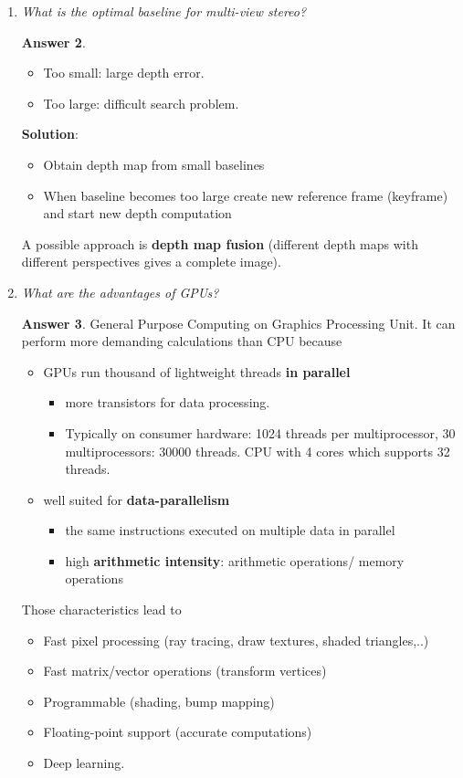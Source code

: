 \documentclass[a4paper,12 pt]{article}
\theoremstyle{definition}
\theoremstyle{remark}
\theoremstyle{definition}
\theoremstyle{definition}
\theoremstyle{definition}
\theoremstyle{definition}
\theoremstyle{remark}
\theoremstyle{remark}
\theoremstyle{definition}
\theoremstyle{definition}
\newtheorem*{answer}{Answer}
\begin{document}
\begin{enumerate}
\begin{answer}
\end{answer}

\item \textit{What is the optimal baseline for multi-view stereo?}
\begin{answer}
\
\begin{itemize}
\item Too small: large depth error.
\item Too large: difficult search problem.
\end{itemize}
\textbf{Solution}: 
\begin{itemize}
\item Obtain depth map from small baselines
\item When baseline becomes too large create new reference frame (keyframe) and start new depth computation
\end{itemize}
A possible approach is \textbf{depth map fusion} (different depth maps with different perspectives gives a complete image).
\end{answer}
\item \textit{What are the advantages of GPUs?}
\begin{answer}
General Purpose Computing on Graphics Processing Unit. It can perform more demanding calculations than CPU because
\begin{itemize}
\item GPUs run thousand of lightweight threads \textbf{in parallel}
\begin{itemize}
\item more transistors for data processing.
\item Typically on consumer hardware: 1024 threads per multiprocessor, 30 multiprocessors: 30000 threads. CPU with 4 cores which supports 32 threads. 
\end{itemize}
\item well suited for \textbf{data-parallelism} 
\begin{itemize}
\item the same instructions executed on multiple data in parallel
\item high \textbf{arithmetic intensity}: arithmetic operations/ memory operations
\end{itemize}
\end{itemize}
Those characteristics lead to
\begin{itemize}
\item Fast pixel processing (ray tracing, draw textures, shaded triangles,..)
\item Fast matrix/vector operations (transform vertices)
\item Programmable (shading, bump mapping)
\item Floating-point support (accurate computations)
\item Deep learning.
\end{itemize}
\end{answer}
\end{enumerate}
\newpage
\end{document}
